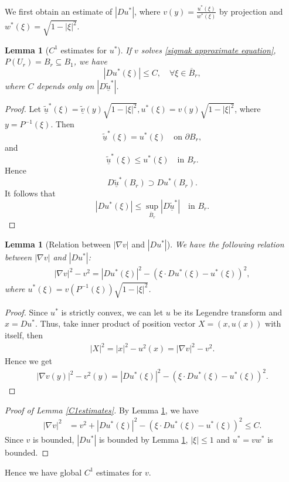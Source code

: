 \documentclass[reqno]{amsart}
\newtheorem{lemma}[theorem]{Lemma}
\theoremstyle{remark}
\theoremstyle{definition}
\numberwithin{equation}{section}
\begin{document}
We first obtain an estimate of $\left| D u^* \right|$, where $v(y) = \frac{u^*(\xi)}{w^*(\xi)}$ by projection and $w^*(\xi) = \sqrt{1 - |\xi |^2}$. 
\begin{lemma}[$C^1$ estimates for $u^*$]\label{C1estimates for u*}
    If $v$ solves \eqref{sigmak approximate equation}, $P(U_r) = B_r \subseteq B_1$, we have
    \[
    \left| D u^*(\xi) \right| \leqslant C , \quad \forall \xi \in \overline{B}_r,
    \]
    where $C$ depends only on $|D \tilde{\underline{u}}^*|$.
\end{lemma}
\begin{proof}
    Let $\tilde{\underline{u}}^*(\xi) = \tilde{\underline{v}}(y) \sqrt{1 - |\xi|^2}, u^*(\xi) = v(y) \sqrt{1 - |\xi|^2}$, where $y=P^{-1}(\xi)$. Then
    \[
    \tilde{\underline{u}}^*(\xi) = u^*(\xi) \quad \text{on } \partial B_r,
    \]
    and
    \[
    \tilde{\underline{u}}^*(\xi) \leqslant u^*(\xi) \quad \text{in } B_r.
    \]
    Hence
    \[
    D \tilde{\underline{u}}^*(B_r) \supset D u^*(B_r).
    \]
    It follows that
    \[
    |D u^*(\xi)| \leqslant \sup_{\overline{B}_r} |D \tilde{\underline{u}}^*| \quad \text{in } B_r.
    \]
\end{proof}

\begin{lemma}[Relation between $|\nabla v|$ and $|D u^*|$] \label{Relation}
    We have the following relation between $|\nabla v|$ and $|D u^*|$:
    \begin{align*}
        |\nabla v|^2 - v^2 = |D u^*(\xi)|^2 - (\xi \cdot D u^*(\xi) - u^*(\xi))^2,
    \end{align*}
    where  $u^*(\xi) = v(P^{-1}(\xi)) \sqrt{1 - |\xi|^2}$.
    \end{lemma}
\begin{proof}
    Since $u^*$ is strictly convex, we can let $u$ be its Legendre transform and $x=D u^*$.  
  Thus,  take inner product of position vector $X=(x,u(x))$ with itself, then
    \begin{align*}
        |X|^2 = |x|^2 - u^2(x) = |\nabla v|^2 - v^2.
    \end{align*}
    Hence we get
    \begin{align*}
        |\nabla v(y)|^2 - v^2(y) = |D u^*(\xi)|^2 - (\xi \cdot D u^*(\xi) - u^*(\xi))^2.
    \end{align*}
 \end{proof}

\begin{proof}[Proof of Lemma \ref{C1estimates}]
    By Lemma \ref{Relation}, we have
    \begin{align*}
        |\nabla v|^2 &= v^2 + |D u^*(\xi)|^2 - (\xi \cdot D u^*(\xi) - u^*(\xi))^2 \leqslant C. 
    \end{align*}
    Since $v$ is bounded, $|D u^*|$ is bounded by Lemma \ref{C1estimates for u*}, $|\xi| \leqslant 1$ and $u^* = v w^*$ is bounded.
\end{proof}
Hence we have global $C^1$ estimates for $v$.
\end{document}
